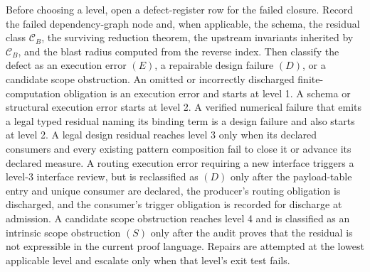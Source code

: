 \documentclass[
  11pt,
]{article}
\theoremstyle{definition}
\begin{document}
Before choosing a level, open a defect-register row for the failed
closure. Record the failed dependency-graph node and, when applicable,
the schema, the
residual class \(\mathcal C_B\), the surviving reduction theorem, the
upstream invariants inherited by \(\mathcal C_B\), and the blast radius
computed from the reverse index. Then classify the defect as an
execution error \((E)\), a repairable design failure \((D)\), or a
candidate scope obstruction. An omitted or incorrectly discharged
finite-computation obligation is an execution error and starts at level
1. A schema or structural execution error starts at level 2. A verified
numerical failure that emits a legal typed residual naming its binding
term is a design failure and also starts at level 2. A legal design
residual reaches level 3 only when its declared consumers and every
existing pattern composition fail to close it or advance its declared
measure. A routing execution error requiring a new interface triggers a
level-3 interface review, but is reclassified as \((D)\) only after the
payload-table entry and unique consumer are declared, the producer's
routing obligation is discharged, and the consumer's trigger obligation is
recorded for discharge at admission. A candidate scope obstruction
reaches level 4 and is classified as an
intrinsic scope obstruction \((S)\) only after the audit proves that the
residual is not expressible in the current proof language. Repairs are
attempted at the lowest applicable level and escalate only when that
level's exit test fails.
\end{document}
